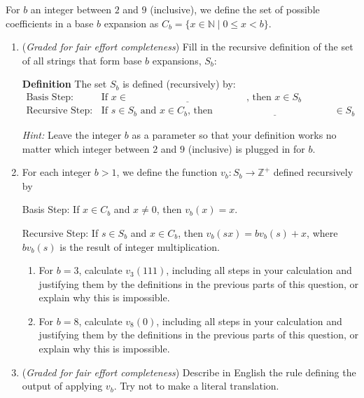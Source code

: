 
For $b$ an integer between $2$ and $9$ (inclusive), we define the set of possible coefficients 
in a base $b$ expansion as  $C_b = \{ x \in \mathbb{N} \mid 0 \leq x < b \}$.
\begin{enumerate}
\item  ({\it Graded for fair effort completeness}) Fill in the recursive definition of the set of all strings that form base $b$ expansions, $S_b$: 

{\bf Definition} The set $S_b$ is defined (recursively) by:
\[
\begin{array}{ll}
\textrm{Basis Step: } & \textrm{If } x \in \underline{\phantom{\hspace{2in}}} \textrm{, then } x \in S_b\\
\textrm{Recursive Step: } & \textrm{If } s \in S_b \textrm{ and } x \in C_b \textrm{, then }
\underline{\phantom{\hspace{2in}}} \in S_b
\end{array}
\]

{\it Hint:} Leave the integer $b$ as a parameter so that your definition works no matter which integer
between $2$ and $9$ (inclusive) is plugged in for $b$.
\item For each integer $b > 1$, we define the function $v_b: S_b \to \mathbb{Z}^+$ defined recursively by 


Basis Step: If $x \in C_b$ and $x \neq 0$, then $v_b (x) = x$.

Recursive Step: If $s \in S_b$ and $x \in C_b$, then $v_b (sx) = bv_b(s) + x$, where $b v_b (s)$
is the result of integer multiplication.

\begin{enumerate}
\item For $b = 3$, calculate $v_3(111)$, including all steps in your calculation and justifying them by the definitions
in the previous parts of this question, or explain why this is impossible.
\item For $b = 8$, calculate $v_8(0)$, including all steps in your calculation and justifying them by the definitions
in the previous parts of this question, or explain why this is impossible.
\end{enumerate}


\item  ({\it Graded for fair effort completeness}) Describe in English the rule defining the output of applying $v_b$. Try not to make a literal translation.
\end{enumerate}

